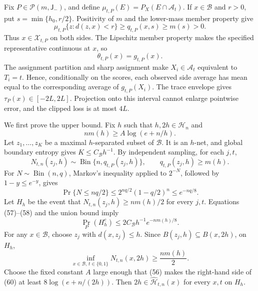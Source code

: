 Fix \(P\in\mathcal P(m,\mathsf J_{-})\), and define
\(\mu_{t,P}(E)=P_X(E\cap\mathcal A_t)\).  If \(x\in\mathcal B\) and
\(r>0\), put \(s=\min\{h_0,r/2\}\).  Positivity of \(m\) and the
lower-mass member property give
\[
 \mu_{t,P}\{z:d(z,x)<r\}
 \ge q_{t,P}(x,s)
 \ge m(s)>0. \tag{54}
\]
Thus \(x\in\mathcal X_{t,P}\) on both sides.  The Lipschitz member
property makes the specified representative continuous at \(x\), so
\[
 \theta_{t,P}(x)=g_{t,P}(x). \tag{55}
\]
The assignment partition and sharp assignment make
\(X_i\in\mathcal A_t\) equivalent to \(T_i=t\).  Hence, conditionally on
the scores, each observed side average has mean equal to the
corresponding average of \(g_{t,P}(X_i)\).  The trace envelope gives
\(\tau_P(x)\in[-2L,2L]\).  Projection onto this interval cannot enlarge
pointwise error, and the clipped loss is at most \(4L\).

We first prove the upper bound.  Fix \(h\) such that
\(h,2h\in\mathcal H_n\) and
\[
 nm(h)\ge A\log(e+n/h). \tag{56}
\]
Let \(z_1,\ldots,z_K\) be a maximal \(h\)-separated subset of
\(\mathcal B\).  It is an \(h\)-net, and global boundary entropy gives
\(K\le C_{\mathcal B}h^{-1}\).  By independent sampling, for each
\(j,t\),
\[
 N_{t,n}(z_j,h)\sim\operatorname{Bin}\{n,q_{t,P}(z_j,h)\},
 \qquad q_{t,P}(z_j,h)\ge m(h). \tag{57}
\]
For \(N\sim\operatorname{Bin}(n,q)\), Markov's inequality applied to
\(2^{-N}\), followed by \(1-y\le e^{-y}\), gives
\[
 \Pr\{N\le nq/2\}
 \le2^{nq/2}(1-q/2)^n
 \le e^{-nq/8}. \tag{58}
\]
Let \(H_h\) be the event that
\(N_{t,n}(z_j,h)\ge nm(h)/2\) for every \(j,t\).  Equations (57)--(58)
and the union bound imply
\[
 \Pr_P(H_h^c)\le2C_{\mathcal B}h^{-1}e^{-nm(h)/8}. \tag{59}
\]
For any \(x\in\mathcal B\), choose \(z_j\) with \(d(x,z_j)\le h\).
Since \(B(z_j,h)\subseteq B(x,2h)\), on \(H_h\),
\[
 \inf_{x\in\mathcal B,\,t\in\{0,1\}}N_{t,n}(x,2h)
 \ge\frac{nm(h)}2. \tag{60}
\]
Choose the fixed constant \(A\) large enough that (56) makes the
right-hand side of (60) at least \(8\log(e+n/(2h))\).  Then
\(2h\in\widehat{\mathcal H}_{t,n}(x)\) for every \(x,t\) on \(H_h\).


